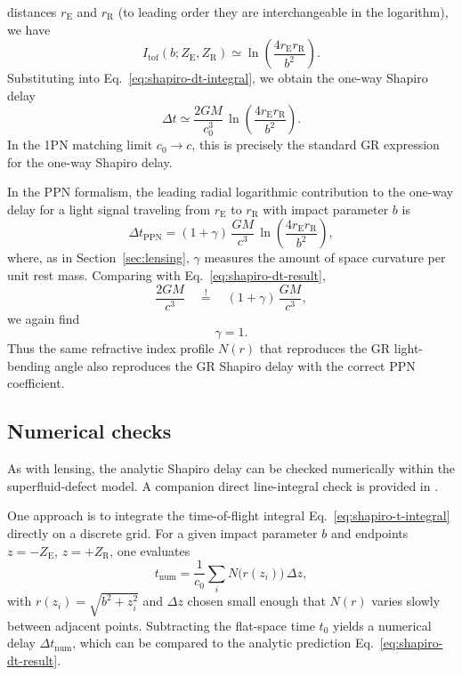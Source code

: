 \documentclass[11pt]{article}
\begin{document}
distances $r_\mathrm{E}$ and $r_\mathrm{R}$ (to leading order they are
interchangeable in the logarithm), we have
\begin{equation}
  I_\mathrm{tof}(b; Z_\mathrm{E}, Z_\mathrm{R})
  \simeq \ln\!\left(
          \frac{4 r_\mathrm{E} r_\mathrm{R}}{b^2}
        \right).
\end{equation}
Substituting into Eq.~\eqref{eq:shapiro-dt-integral}, we obtain the one-way
Shapiro delay
\begin{equation}
  \Delta t
  \simeq \frac{2GM}{c_0^3}\,
         \ln\!\left(\frac{4 r_\mathrm{E} r_\mathrm{R}}{b^2}\right).
  \label{eq:shapiro-dt-result}
\end{equation}
In the 1PN matching limit $c_0 \to c$, this is precisely the standard GR
expression for the one-way Shapiro delay.

In the PPN formalism, the leading radial logarithmic contribution to the
one-way delay for a light signal traveling from $r_\mathrm{E}$ to
$r_\mathrm{R}$ with impact parameter $b$ is
\begin{equation}
  \Delta t_{\text{PPN}}
  = (1 + \gamma)\,\frac{GM}{c^3}\,
    \ln\!\left(\frac{4 r_\mathrm{E} r_\mathrm{R}}{b^2}\right),
\end{equation}
where, as in Section~\ref{sec:lensing}, $\gamma$ measures the amount of
space curvature per unit rest mass.
Comparing with Eq.~\eqref{eq:shapiro-dt-result},
\begin{equation}
  \frac{2GM}{c^3}
  \quad\stackrel{!}{=}\quad
  (1+\gamma)\,\frac{GM}{c^3},
\end{equation}
we again find
\begin{equation}
  \gamma = 1.
\end{equation}
Thus the same refractive index profile $N(r)$ that reproduces the GR
light-bending angle also reproduces the GR Shapiro delay with the correct
PPN coefficient.


\subsection{Numerical checks}
\label{subsec:shapiro-numerics}

As with lensing, the analytic Shapiro delay can be checked numerically
within the superfluid-defect model.  A companion direct line-integral check
is provided in .

One approach is to integrate the time-of-flight integral
Eq.~\eqref{eq:shapiro-t-integral} directly on a discrete grid.
For a given impact parameter $b$ and endpoints $z=-Z_\mathrm{E}$,
$z=+Z_\mathrm{R}$, one evaluates
\begin{equation}
  t_\mathrm{num}
  = \frac{1}{c_0}\sum_i N\bigl(r(z_i)\bigr)\,\Delta z,
\end{equation}
with $r(z_i) = \sqrt{b^2 + z_i^2}$ and $\Delta z$ chosen small enough that
$N(r)$ varies slowly between adjacent points.
Subtracting the flat-space time $t_0$ yields a numerical delay
$\Delta t_\mathrm{num}$, which can be compared to the analytic prediction
Eq.~\eqref{eq:shapiro-dt-result}.
\end{document}
